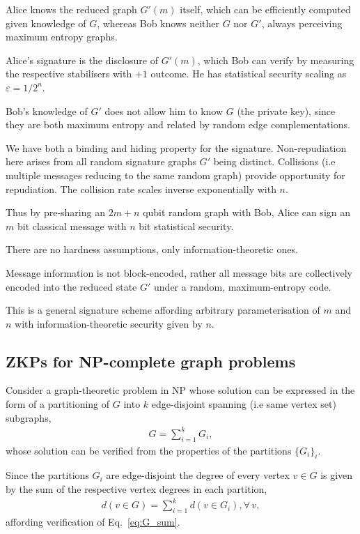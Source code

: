 \documentclass[twocolumn, aps, amsmath, amssymb, nofootinbib, superscriptaddress, longbibliography, doublefloatfix, table-of-contents, eqsecnum, rmp]{revtex4-2}
\begin{document}
Alice knows the reduced graph $G'(m)$ itself, which can be efficiently computed given knowledge of $G$, whereas Bob knows neither $G$ nor $G'$, always perceiving maximum entropy graphs.

Alice's signature is the disclosure of $G'(m)$, which Bob can verify by measuring the respective stabilisers with $+1$ outcome. He has statistical security scaling as \mbox{$\varepsilon = 1/2^n$}.

Bob's knowledge of $G'$ does not allow him to know $G$ (the private key), since they are both maximum entropy and related by random edge complementations.

We have both a binding and hiding property for the signature. Non-repudiation here arises from all random signature graphs $G'$ being distinct. Collisions (i.e multiple messages reducing to the same random graph) provide opportunity for repudiation. The collision rate scales inverse exponentially with $n$.

Thus by pre-sharing an $2m+n$ qubit random graph with Bob, Alice can sign an $m$ bit classical message with $n$ bit statistical security.

There are no hardness assumptions, only information-theoretic ones.

Message information is not block-encoded, rather all message bits are collectively encoded into the reduced state $G'$ under a random, maximum-entropy code.

This is a general signature scheme affording arbitrary parameterisation of $m$ and $n$ with information-theoretic security given by $n$.

\subsection{ZKPs for NP-complete graph problems}

Consider a graph-theoretic problem in NP whose solution can be expressed in the form of a partitioning of $G$ into $k$ edge-disjoint spanning (i.e same vertex set) subgraphs,
\begin{align} \label{eq:G_sum}
	G = \sum_{i=1}^k G_i,
\end{align}
whose solution can be verified from the properties of the partitions $\{G_i\}_i$.

Since the partitions $G_i$ are edge-disjoint the degree of every vertex $v\in G$ is given by the sum of the respective vertex degrees in each partition,
\begin{align}
	d(v\in G) = \sum_{i=1}^k d(v\in G_i),\forall\, v, 
\end{align}
affording verification of Eq.~\eqref{eq:G_sum}.
\end{document}
